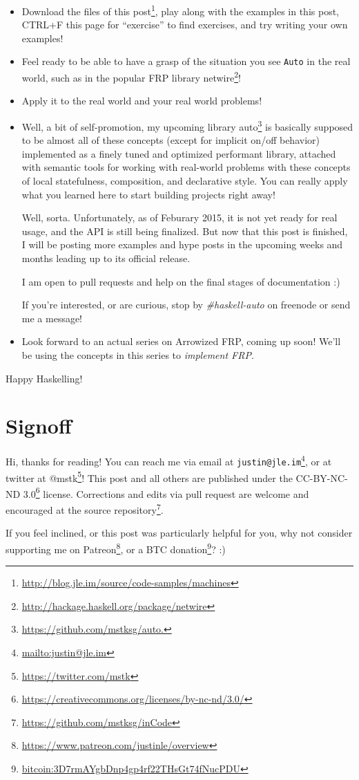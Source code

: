 \documentclass[]{article}
\renewcommand{\href}[2]{#2\footnote{\url{#1}}}
\begin{document}
\begin{itemize}
\item
  \href{http://blog.jle.im/source/code-samples/machines}{Download the files of
  this post}, play along with the examples in this post, CTRL+F this page for
  ``exercise'' to find exercises, and try writing your own examples!
\item
  Feel ready to be able to have a grasp of the situation you see \texttt{Auto}
  in the real world, such as in the popular FRP library
  \href{http://hackage.haskell.org/package/netwire}{netwire}!
\item
  Apply it to the real world and your real world problems!
\item
  Well, a bit of self-promotion, my upcoming library
  \href{https://github.com/mstksg/auto.}{auto} is basically supposed to be
  almost all of these concepts (except for implicit on/off behavior) implemented
  as a finely tuned and optimized performant library, attached with semantic
  tools for working with real-world problems with these concepts of local
  statefulness, composition, and declarative style. You can really apply what
  you learned here to start building projects right away!

  Well, sorta. Unfortunately, as of Feburary 2015, it is not yet ready for real
  usage, and the API is still being finalized. But now that this post is
  finished, I will be posting more examples and hype posts in the upcoming weeks
  and months leading up to its official release.

  I am open to pull requests and help on the final stages of documentation :)

  If you're interested, or are curious, stop by \emph{\#haskell-auto} on
  freenode or send me a message!
\item
  Look forward to an actual series on Arrowized FRP, coming up soon! We'll be
  using the concepts in this series to \emph{implement FRP}.
\end{itemize}

Happy Haskelling!

\hypertarget{signoff}{%
\section{Signoff}\label{signoff}}

Hi, thanks for reading! You can reach me via email at
\href{mailto:justin@jle.im}{\nolinkurl{justin@jle.im}}, or at twitter at
\href{https://twitter.com/mstk}{@mstk}! This post and all others are published
under the \href{https://creativecommons.org/licenses/by-nc-nd/3.0/}{CC-BY-NC-ND
3.0} license. Corrections and edits via pull request are welcome and encouraged
at \href{https://github.com/mstksg/inCode}{the source repository}.

If you feel inclined, or this post was particularly helpful for you, why not
consider \href{https://www.patreon.com/justinle/overview}{supporting me on
Patreon}, or a \href{bitcoin:3D7rmAYgbDnp4gp4rf22THsGt74fNucPDU}{BTC donation}?
:)
\end{document}
